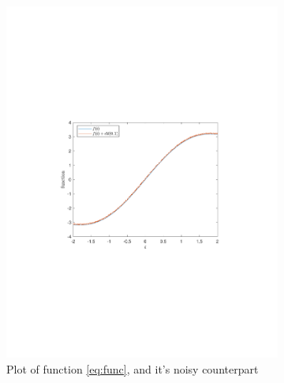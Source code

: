 \documentclass[a4paper]{article}
\begin{document}
\begin{figure}[H]
	\centering
	\begin{subfigure}{0.49\textwidth}
	\centering
	\includegraphics[trim={4cm 8cm 4cm 8cm},clip,width=1\textwidth]{Images/FuncNoise.pdf}
	\caption{Plot of function \cref{eq:func}, and it's noisy counterpart}
	\label{sub:FuncNoiseD=0}
\end{subfigure}
	\begin{subfigure}{0.49\textwidth}
		\centering

\end{subfigure}
\end{figure}
\end{document}
